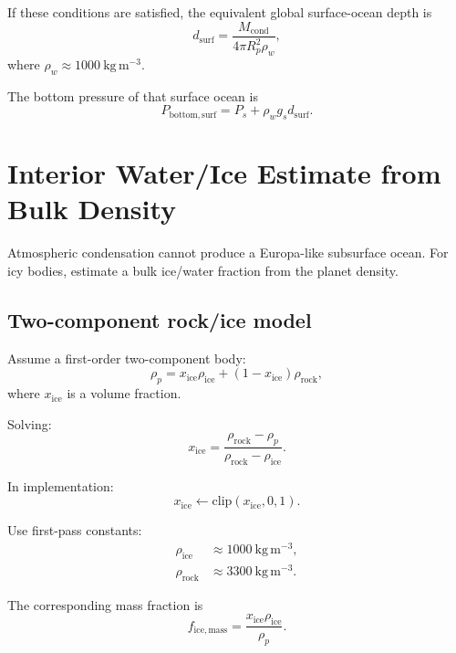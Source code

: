 \documentclass[11pt]{article}
\begin{document}
If these conditions are satisfied, the equivalent global surface-ocean depth is
\begin{equation}
    d_{\mathrm{surf}}
    =
    \frac{M_{\mathrm{cond}}}
    {4\pi R_p^2 \rho_w},
\end{equation}
where $\rho_w \approx 1000\ \mathrm{kg\,m^{-3}}$.

The bottom pressure of that surface ocean is
\begin{equation}
    P_{\mathrm{bottom,surf}}
    =
    P_s + \rho_w g_s d_{\mathrm{surf}}.
\end{equation}

\section{Interior Water/Ice Estimate from Bulk Density}

Atmospheric condensation cannot produce a Europa-like subsurface ocean. For
icy bodies, estimate a bulk ice/water fraction from the planet density.

\subsection{Two-component rock/ice model}

Assume a first-order two-component body:
\begin{equation}
    \rho_p =
    x_{\mathrm{ice}} \rho_{\mathrm{ice}}
    +
    (1-x_{\mathrm{ice}})\rho_{\mathrm{rock}},
\end{equation}
where $x_{\mathrm{ice}}$ is a volume fraction.

Solving:
\begin{equation}
    x_{\mathrm{ice}}
    =
    \frac{\rho_{\mathrm{rock}}-\rho_p}
    {\rho_{\mathrm{rock}}-\rho_{\mathrm{ice}}}.
\end{equation}

In implementation:
\begin{equation}
    x_{\mathrm{ice}} \leftarrow
    \mathrm{clip}(x_{\mathrm{ice}},0,1).
\end{equation}

Use first-pass constants:
\begin{align}
    \rho_{\mathrm{ice}}  &\approx 1000\ \mathrm{kg\,m^{-3}}, \\
    \rho_{\mathrm{rock}} &\approx 3300\ \mathrm{kg\,m^{-3}}.
\end{align}

The corresponding mass fraction is
\begin{equation}
    f_{\mathrm{ice,mass}}
    =
    \frac{x_{\mathrm{ice}}\rho_{\mathrm{ice}}}{\rho_p}.
\end{equation}
\end{document}
